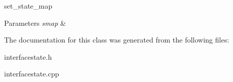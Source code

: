 set\+\_\+state\+\_\+map 


\begin{DoxyParams}{Parameters}
{\em smap} & \\
\hline
\end{DoxyParams}


The documentation for this class was generated from the following files\+:\begin{DoxyCompactItemize}
\item 
interfacestate.\+h\item 
interfacestate.\+cpp\end{DoxyCompactItemize}
